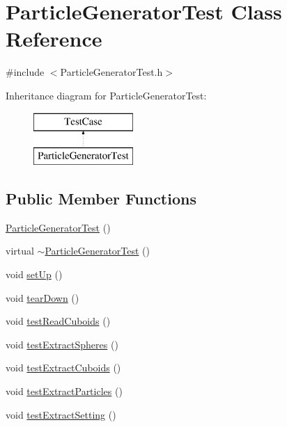 \hypertarget{classParticleGeneratorTest}{\section{Particle\-Generator\-Test Class Reference}
\label{classParticleGeneratorTest}
}


{\ttfamily \#include $<$Particle\-Generator\-Test.\-h$>$}

Inheritance diagram for Particle\-Generator\-Test\-:\begin{figure}[H]
\begin{center}
\leavevmode
\includegraphics[height=2.000000cm]{classParticleGeneratorTest}
\end{center}
\end{figure}
\subsection*{Public Member Functions}
\begin{DoxyCompactItemize}
\item 
\hyperlink{classParticleGeneratorTest_af27d139a180f3d07501c726069abac48}{Particle\-Generator\-Test} ()
\item 
virtual \hyperlink{classParticleGeneratorTest_a2882f3ae2508ac7541649ad0445f76e6}{$\sim$\-Particle\-Generator\-Test} ()
\item 
void \hyperlink{classParticleGeneratorTest_a5c5c45fa56773e0218ba9f827f7e78ca}{set\-Up} ()
\item 
void \hyperlink{classParticleGeneratorTest_a69d4bc5f9c69e3c6f34e0c3af750aa94}{tear\-Down} ()
\item 
void \hyperlink{classParticleGeneratorTest_a4c1fd9d420494447ea32d17c36247c1e}{test\-Read\-Cuboids} ()
\item 
void \hyperlink{classParticleGeneratorTest_af39387b0fc5449917c9388333a0b4383}{test\-Extract\-Spheres} ()
\item 
void \hyperlink{classParticleGeneratorTest_a32f14ce21a6f77874bbc9de88cd86fce}{test\-Extract\-Cuboids} ()
\item 
void \hyperlink{classParticleGeneratorTest_ae29a8a4fa5da0d37a0d5aef7f695cb58}{test\-Extract\-Particles} ()
\item 
void \hyperlink{classParticleGeneratorTest_a10a24cc68339e370d55e86037383b7bc}{test\-Extract\-Setting} ()
\end{DoxyCompactItemize}

